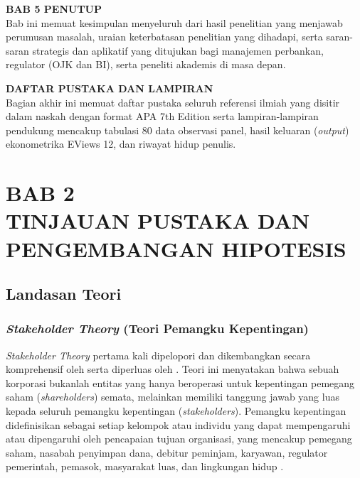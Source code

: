 \documentclass[12pt,a4paper]{article}
\numberwithin{equation}{section}
\begin{document}
\noindent
\textbf{BAB 5 PENUTUP}\\
Bab ini memuat kesimpulan menyeluruh dari hasil penelitian yang menjawab perumusan masalah, uraian keterbatasan penelitian yang dihadapi, serta saran-saran strategis dan aplikatif yang ditujukan bagi manajemen perbankan, regulator (OJK dan BI), serta peneliti akademis di masa depan.

\noindent
\textbf{DAFTAR PUSTAKA DAN LAMPIRAN}\\
Bagian akhir ini memuat daftar pustaka seluruh referensi ilmiah yang disitir dalam naskah dengan format APA 7th Edition serta lampiran-lampiran pendukung mencakup tabulasi 80 data observasi panel, hasil keluaran (\emph{output}) ekonometrika EViews 12, dan riwayat hidup penulis.

\newpage
\setcounter{section}{0}
\section*{BAB 2\\[0.3cm]TINJAUAN PUSTAKA DAN PENGEMBANGAN HIPOTESIS}
\setcounter{section}{2}
\setcounter{subsection}{0}
\setcounter{equation}{0}

\subsection{Landasan Teori}

\subsubsection{\emph{Stakeholder Theory} (Teori Pemangku Kepentingan)}
\noindent
\emph{Stakeholder Theory} pertama kali dipelopori dan dikembangkan secara komprehensif oleh \citet{Freeman2010} serta diperluas oleh \citet{DonaldsonPreston1995}. Teori ini menyatakan bahwa sebuah korporasi bukanlah entitas yang hanya beroperasi untuk kepentingan pemegang saham (\emph{shareholders}) semata, melainkan memiliki tanggung jawab yang luas kepada seluruh pemangku kepentingan (\emph{stakeholders}). Pemangku kepentingan didefinisikan sebagai setiap kelompok atau individu yang dapat mempengaruhi atau dipengaruhi oleh pencapaian tujuan organisasi, yang mencakup pemegang saham, nasabah penyimpan dana, debitur peminjam, karyawan, regulator pemerintah, pemasok, masyarakat luas, dan lingkungan hidup \citep{Freeman2010}.
\end{document}

